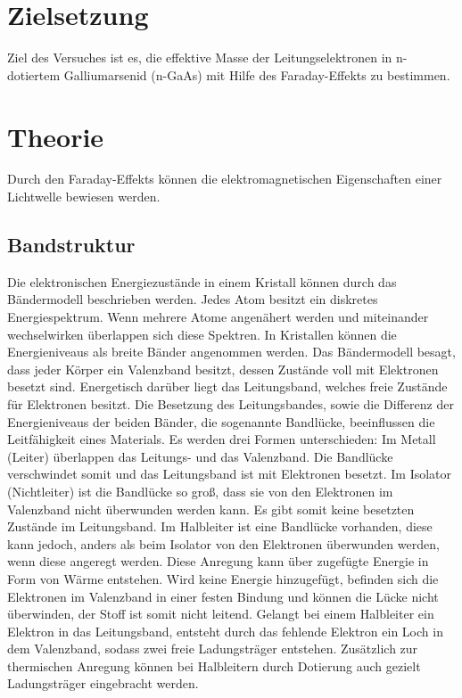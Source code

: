 \section{Zielsetzung}
\label{sec:Zielsetzung}

Ziel des Versuches ist es, die effektive Masse der Leitungselektronen in n-dotiertem Galliumarsenid (n-GaAs)
mit Hilfe des Faraday-Effekts zu bestimmen.

\section{Theorie}
\label{sec:Theorie}

Durch den Faraday-Effekts können die elektromagnetischen Eigenschaften einer Lichtwelle bewiesen werden.

\subsection{Bandstruktur}
\label{sub:Bandstruktur}
Die elektronischen Energiezustände in einem Kristall können durch das Bändermodell beschrieben werden.
Jedes Atom besitzt ein diskretes Energiespektrum. Wenn mehrere Atome angenähert werden und miteinander
wechselwirken überlappen sich diese Spektren. In Kristallen können die Energieniveaus als breite Bänder angenommen werden.
Das Bändermodell besagt, dass jeder Körper ein Valenzband besitzt, dessen Zustände voll mit Elektronen besetzt sind.
Energetisch darüber liegt das Leitungsband, welches freie Zustände für Elektronen besitzt.
Die Besetzung des Leitungsbandes, sowie die Differenz der Energieniveaus der beiden Bänder, die sogenannte Bandlücke,
beeinflussen die Leitfähigkeit eines Materials.
Es werden drei Formen unterschieden:
Im Metall (Leiter) überlappen das Leitungs- und das Valenzband. Die Bandlücke verschwindet somit und das Leitungsband ist mit Elektronen besetzt.
Im Isolator (Nichtleiter) ist die Bandlücke so groß, dass sie von den Elektronen im Valenzband nicht überwunden werden kann. Es gibt somit keine
besetzten Zustände im Leitungsband.
Im Halbleiter ist eine Bandlücke vorhanden, diese kann jedoch, anders als beim Isolator von den Elektronen überwunden werden, wenn diese angeregt werden.
Diese Anregung kann über zugefügte Energie in Form von Wärme entstehen.
Wird keine Energie hinzugefügt, befinden sich die Elektronen im Valenzband in einer festen Bindung und können die Lücke
nicht überwinden, der Stoff ist somit nicht leitend.
Gelangt bei einem Halbleiter ein Elektron in das Leitungsband, entsteht durch das fehlende Elektron ein Loch in dem Valenzband, sodass zwei freie 
Ladungsträger entstehen.
Zusätzlich zur thermischen Anregung können bei Halbleitern durch Dotierung auch gezielt Ladungsträger eingebracht werden.

